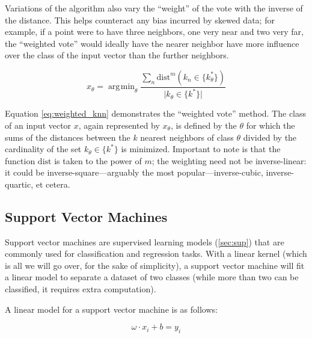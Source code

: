 \documentclass[a4paper]{comjnl}
\newcommand{\abs}[1]{\lvert #1 \rvert}
\DeclareMathOperator*{\argmin}{\arg\!\min}
\numberwithin{equation}{subsection}
\begin{document}
            Variations of the algorithm also vary the ``weight'' of the vote with the inverse of
            the distance. This helps counteract any bias incurred by skewed data; for example, if
            a point were to have three neighbors, one very near and two very far, the ``weighted
            vote'' would ideally have the nearer neighbor have more influence over the class of the
            input vector than the further neighbors.

            \begin{equation}\label{eq:weighted_knn}
                x_{\theta}=\argmin_{\theta} \frac{\sum_n{\text{dist}^m(k_n \in \{k_{\theta}^*\})}}{\abs{k_{\theta} \in \{k^*\}}}
            \end{equation}

            \noindent Equation \eqref{eq:weighted_knn} demonstrates the ``weighted vote'' method.
            The class of an input vector $x$, again represented by $x_{\theta}$, is defined by the
            $\theta$ for which the sums of the distances between the $k$ nearest neighbors of class
            $\theta$ divided by the cardinality of the set $k_{\theta} \in \{k^{*}\}$ is minimized.
            Important to note is that the function $\text{dist}$ is taken to the power of $m$; the
            weighting need not be inverse-linear: it could be inverse-square---arguably the most
            popular---inverse-cubic, inverse-quartic, et cetera.

        \subsection{Support Vector Machines}\label{subsec:svm}

            Support vector machines are supervised learning models (\ref{sec:sup}) that are commonly
            used for classification and regression tasks. With a linear kernel (which is all we
            will go over, for the sake of simplicity), a support vector machine will fit a linear
            model to separate a dataset of two classes (while more than two can be classified, it
            requires extra computation).

            A linear model for a support vector machine is as follows:

            \begin{equation}\label{eq:hyperplane}
                \omega \cdot x_i + b = y_i
            \end{equation}
\end{document}
